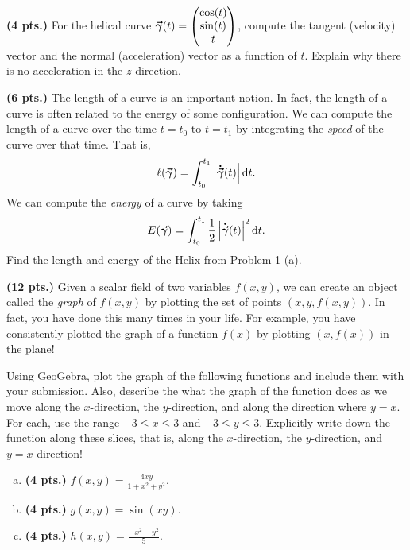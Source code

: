 \documentclass[12pt]{article} %
\begin{document}
\vspace*{0.5cm}

\begin{problem}
\textbf{(4 pts.)} For the helical curve $\boldsymbol{\vec{\gamma}}(t) = \begin{pmatrix} \cos(t) \\ \sin(t) \\ t \end{pmatrix}$, compute the tangent (velocity) vector and the normal (acceleration) vector as a function of $t$. Explain why there is no acceleration in the $z$-direction.
\end{problem}

\vspace*{0.5cm}

\begin{problem}
\textbf{(6 pts.)} The length of a curve is an important notion. In fact, the length of a curve is often related to the energy of some configuration. We can compute the length of a curve over the time $t=t_0$ to $t=t_1$ by integrating the \emph{speed} of the curve over that time.  That is,
\[
\ell(\boldsymbol{\vec{\gamma}}) = \int_{t_0}^{t_1} \left|\boldsymbol{\dot{\vec{\gamma}}}(t)\right| \mathop{}\!\mathrm{d} t.
\]
We can compute the \emph{energy} of a curve by taking
\[
E(\boldsymbol{\vec{\gamma}}) = \int_{t_0}^{t_1} \frac{1}{2} \left| \boldsymbol{\dot{\vec{\gamma}}}(t)\right|^2 \mathop{}\!\mathrm{d} t.
\]
Find the length and energy of the Helix from Problem 1 (a).
\end{problem}

\vspace*{0.5cm}

\begin{problem}
\textbf{(12 pts.)} Given a scalar field of two variables $f(x,y)$, we can create an object called the \emph{graph} of $f(x,y)$ by plotting the set of points $(x,y,f(x,y))$. In fact, you have done this many times in your life. For example, you have consistently plotted the graph of a function $f(x)$ by plotting $(x,f(x))$ in the plane!

Using GeoGebra, plot the graph of the following functions and include them with your submission.  Also, describe the what the graph of the function does as we move along the $x$-direction, the $y$-direction, and along the direction where $y=x$. For each, use the range $-3\leq x \leq 3$ and $-3\leq y \leq 3$. Explicitly write down the function along these slices, that is, along the $x$-direction, the $y$-direction, and $y=x$ direction!
\begin{enumerate}[(a)]
	\item \textbf{(4 pts.)} $f(x,y) = \frac{4xy}{1+x^2+y^2}$.
	\item \textbf{(4 pts.)} $g(x,y) = \sin(xy)$.
	\item \textbf{(4 pts.)} $h(x,y) = \frac{-x^2-y^2}{5}$.
\end{enumerate}
\end{problem}
\end{document}
